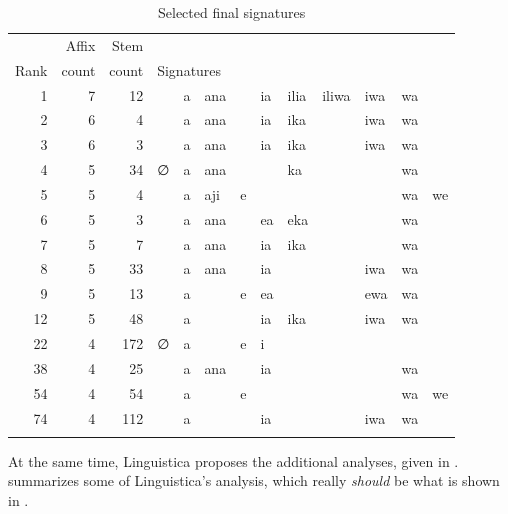 \documentclass[output=paper,colorlinks,citecolor=brown]{langscibook}
\begin{document}
\begin{table}
\begin{tabular}{rrr *{9}{l@{~~}}l}\lsptoprule
& Affix & Stem   & \\ 
Rank &   count & count & \multicolumn{9}{l}{Signatures}  \\ \midrule
1 & 7 & 12 &     & a & ana && ia & ilia & iliwa & iwa & wa   \\
2 & 6&   4  &     & a & ana && ia & ika & & iwa &wa \\
3 & 6& 3  &     & a & ana && ia &ika  & & iwa& wa \\
4 & 5 & 34 & ∅& a & ana && & ka &     & &   wa \\
5 & 5 & 4  &     & a & aji & e & & & && wa & we \\
6 & 5 & 3 &      & a & ana && ea & eka &&& wa \\
7 & 5 & 7 &      & a & ana && ia & 	ika &&& wa \\
8 & 5 & 33 &     & a  & ana &&ia &&& iwa & wa  \\
9 & 5 & 13 &     & a  && e & ea &&& ewa & wa \\ 
12 &5 & 48 & &a &&&ia &ika &&iwa &wa \\
22 & 4 &172 & ∅ & a&& e& i \\
38 & 4 &25 &&    a & ana&&  ia&&&&  wa \\
54 & 4 & 54 & & a &&e &&&&&wa & we \\
74 & 4 &  112 && a&&& ia&&& iwa& wa \\
  \lspbottomrule
\end{tabular}
\caption{Selected final signatures}
\label{final-sigs-2}
\end{table}



At the same time, Linguistica proposes the additional analyses, given in .  summarizes some of Linguistica's 
analysis, which really {\itshape should} be what is shown in .
\end{document}
